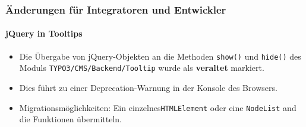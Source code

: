 %

\begin{frame}[fragile]
	\frametitle{Änderungen für Integratoren und Entwickler}
	\framesubtitle{jQuery in Tooltips}


	\begin{itemize}
		\item Die Übergabe von jQuery-Objekten an die Methoden \texttt{show()} und \texttt{hide()}
			des Moduls \texttt{TYPO3/CMS/Backend/Tooltip} wurde als
			\textbf{veraltet} markiert.
		\item Dies führt zu einer Deprecation-Warnung in der Konsole des Browsers.
		\item Migrationsmöglichkeiten:
			Ein einzelnes\texttt{HTMLElement} oder eine \texttt{NodeList} and die
			Funktionen übermitteln.
	\end{itemize}

\end{frame}

